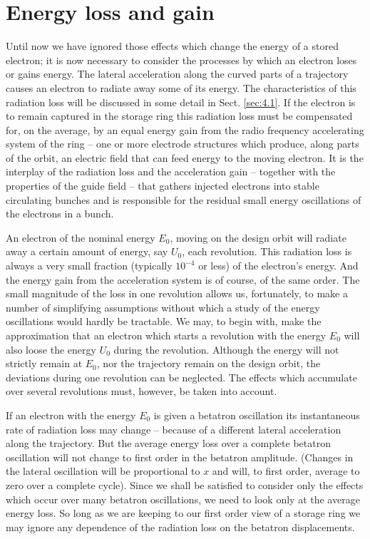 \section{Energy loss and gain}\label{sec:3.4}
Until now we have ignored those effects which change the energy of a stored electron; it is now necessary to consider the processes by which an electron loses or gains energy. The lateral acceleration along the curved parts of a trajectory causes an electron to radiate away some of its energy. The characteristics of this radiation loss will be discussed in some detail in Sect. \ref{sec:4.1}. If the electron is to remain captured in the storage ring this radiation loss must be compensated for, on the average, by an equal energy gain from the radio frequency accelerating system of the ring -- one or more electrode structures which produce, along parts of the orbit, an electric field that can feed energy to the moving electron. It is the interplay of the radiation loss and the acceleration gain -- together with the properties of the guide field -- that gathers injected electrons into stable circulating bunches and is responsible for the residual small energy oscillations of the electrons in a bunch.

An electron of the nominal energy $E_0$, moving on the design orbit will radiate away a certain amount of energy, say $U_0$, each revolution. This radiation loss is always a very small fraction (typically $10^{-4}$ or less) of the electron's energy. And the energy gain from the acceleration system is of course, of the same order. The small magnitude of the loss in one revolution allows us, fortunately, to make a number of simplifying assumptions without which a study of the energy oscillations would hardly be tractable. We may, to begin with, make the approximation that an electron which starts a revolution with the energy $E_0$ will also loose the energy $U_0$ during the revolution. Although the energy will not strictly remain at $E_0$, nor the trajectory remain on the design orbit, the deviations during one revolution can be neglected. The effects which accumulate over several revolutions must, however, be taken into account.

If an electron with the energy $E_0$ is given a betatron oscillation its instantaneous rate of radiation loss may change -- because of a different lateral acceleration along the trajectory. But the average energy loss over a complete betatron oscillation will not change to first order in the betatron amplitude. (Changes in the lateral oscillation will be proportional to $x$ and will, to first order, average to zero over a complete
cycle). Since we shall be satisfied to consider only the effects which occur over many betatron oscillations, we need to look only at the average energy loss. So long as we are keeping to our first order view of a storage ring we may ignore any dependence of the radiation loss on the betatron displacements.

